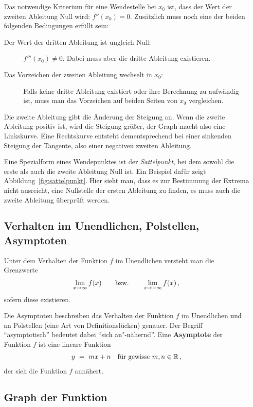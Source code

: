 \noindent Das notwendige Kriterium für eine Wendestelle bei $x_0$ ist, dass der Wert der zweiten Ableitung Null wird: $f''(x_0) = 0$. Zusätzlich muss noch eine der beiden folgenden Bedingungen erfüllt sein:
\begin{description}
    \item[Der Wert der dritten Ableitung ist ungleich Null:] $f'''(x_0)\neq 0$. Dabei muss aber die dritte Ableitung existieren.
    \item[Das Vorzeichen der zweiten Ableitung wechselt in $x_0$:] Falls keine dritte Ableitung existiert oder ihre Berechnung zu aufwändig ist, muss man das Vorzeichen auf beiden Seiten von $x_0$ vergleichen.
\end{description}

\noindent Die zweite Ableitung gibt die Änderung der Steigung an. Wenn die zweite Ableitung positiv ist, wird die Steigung größer, der Graph macht also eine Linkskurve. Eine Rechtskurve entsteht dementsprechend bei einer sinkenden Steigung der Tangente, also einer negativen zweiten Ableitung.

\noindent Eine Spezialform eines Wendepunktes ist der \emph{Sattelpunkt}, bei dem sowohl die erste als auch die zweite Ableitung Null ist. Ein Beispiel dafür zeigt Abbildung~\ref{fig:sattelpunkt}. Hier sieht man, dass es zur Bestimmung der Extrema nicht ausreicht, eine Nullstelle der ersten Ableitung zu finden, es muss auch die zweite Ableitung überprüft werden.

\subsection{Verhalten im Unendlichen, Polstellen, Asymptoten}

Unter dem Verhalten der Funktion $f$ im Unendlichen versteht man die
Grenzwerte
\[
\lim_{x\to\infty}f(x)
\qquad\text{bzw.}\qquad
\lim_{x\to-\infty}f(x)
\,,
\]
sofern diese existieren.

\noindent Die Asymptoten beschreiben das Verhalten der Funktion $f$ im Unendlichen und
an Polstellen (eine Art von Definitionslücken) genauer. Der Begriff "`asymptotisch"' bedeutet dabei "`sich
an"-nähernd"'. Eine \textbf{Asymptote} der Funktion $f$ ist eine lineare
Funktion
\[
y
\ =\ mx+n
\quad\text{für gewisse $m,n\in\mathbb{R}$}
\,,
\]
der sich die Funktion $f$ annähert.

\subsection{Graph der Funktion}

